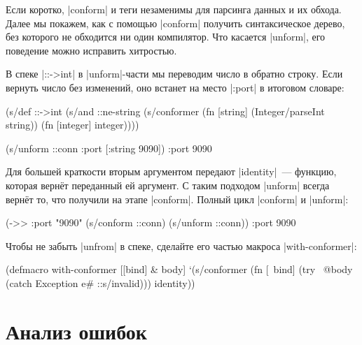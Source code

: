 Если коротко, \spverb|conform| и теги незаменимы для парсинга данных и их
обхода. Далее мы покажем, как с помощью \spverb|conform| получить синтаксическое
дерево, без которого не обходится ни один компилятор. Что касается
\spverb|unform|, его поведение можно исправить хитростью.

В спеке \spverb|::->int| в \spverb|unform|-части мы переводим число в обратно
строку. Если вернуть число без изменений, оно встанет на место \spverb|:port| в
итоговом словаре:

\begin{english}
  \begin{clojure}
(s/def ::->int
  (s/and
   ::ne-string
   (s/conformer
    (fn [string]
      (Integer/parseInt string))
    (fn [integer]
      integer))))

(s/unform ::conn {:port [:string 9090]})
{:port 9090}
  \end{clojure}
\end{english}


Для большей краткости вторым аргументом передают \spverb|identity|~--- функцию,
которая верн\"{е}т переданный ей аргумент. С таким подходом \spverb|unform| всегда
верн\"{е}т то, что получили на этапе \spverb|conform|. Полный цикл \spverb|conform|
и \spverb|unform|:

\begin{english}
  \begin{clojure}
(->> {:port "9090"}
     (s/conform ::conn)
     (s/unform ::conn))
{:port 9090}
  \end{clojure}
\end{english}

Чтобы не забыть \spverb|unfrom| в спеке, сделайте его частью макроса
\spverb|with-conformer|:

\begin{english}
  \begin{clojure}
(defmacro with-conformer
  [[bind] & body]
  `(s/conformer
    (fn [~bind]
      (try
        ~@body
        (catch Exception e#
          ::s/invalid)))
    identity))
  \end{clojure}
\end{english}

\section{Анализ ошибок}


